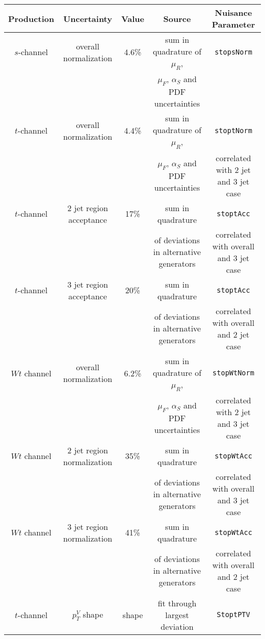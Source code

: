 \begin{table}[!htbp]\captionsetup{justification=centering}
\begin{scriptsize}
\begin{center}
\begin{tabular}{|c|c|c|c|c|}
        \hline
        \hline
        Production & Uncertainty & Value & Source & Nuisance Parameter \\
        \hline
        \hline
        $s$-channel & overall normalization & 4.6\% &  sum in quadrature of $\mu_R$, & \texttt{stopsNorm} \\
                & & & $\mu_F$, $\alpha_{S}$ and PDF uncertainties & \\
        \hline
        $t$-channel & overall normalization & 4.4\% & sum in quadrature of $\mu_R$, & \texttt{stoptNorm} \\
        & & & $\mu_F$, $\alpha_{S}$ and PDF uncertainties &  correlated with 2 jet and 3 jet case \\
        	$t$-channel & 2 jet region acceptance & 17\% & sum in quadrature & \texttt{stoptAcc} \\
	              & & & of deviations in alternative generators  &  correlated with overall and 3 jet case\\ 
	$t$-channel & 3 jet region acceptance & 20\% & sum in quadrature & \texttt{stoptAcc} \\
	              & & & of deviations in alternative generators  & correlated with overall and 2 jet case \\ 
        \hline
        $Wt$ channel & overall normalization & 6.2\% & sum in quadrature of $\mu_R$, & \texttt{stopWtNorm}\\
                        & & & $\mu_F$, $\alpha_{S}$ and PDF uncertainties & correlated with 2 jet and 3 jet case  \\
	$Wt$ channel & 2 jet region normalization & 35\% & sum in quadrature & \texttt{stopWtAcc} \\
	              & & & of deviations in alternative generators  & correlated with overall and 3 jet case \\ 
	$Wt$ channel & 3 jet region normalization & 41\% & sum in quadrature & \texttt{stopWtAcc} \\
	              & & & of deviations in alternative generators  & correlated with overall and 2 jet case\\ 
	\hline
        $t$-channel & $p_T^V$ shape & shape & fit through largest deviation  & \texttt{StoptPTV} \\

\end{tabular}
\end{center}
\end{scriptsize}
\end{table}
